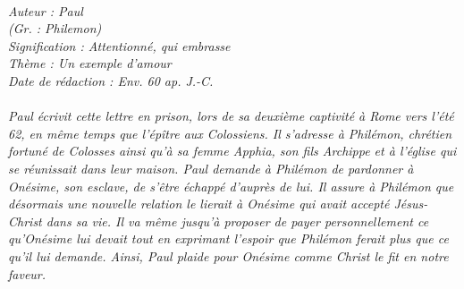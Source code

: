 \BFont
\noindent\hrulefill
{\footnotesize
\textit{
\bigskip
{\centering{}
\\Auteur : Paul
\\(Gr. : Philemon)
\\Signification : Attentionné, qui embrasse
\\Thème : Un exemple d'amour
\\Date de rédaction : Env. 60 ap. J.-C.\\}
}
\textit{
\\Paul écrivit cette lettre en prison, lors de sa deuxième captivité à Rome vers l’été 62, en même temps que l’épître aux Colossiens. Il s’adresse à Philémon, chrétien fortuné de Colosses ainsi qu’à sa femme Apphia, son fils Archippe et à l’église qui se réunissait dans leur maison. Paul demande à Philémon de pardonner à Onésime, son esclave, de s’être échappé d’auprès de lui. Il assure à Philémon que désormais une nouvelle relation le lierait à Onésime qui avait accepté Jésus-Christ dans sa vie. Il va même jusqu’à proposer de payer personnellement ce qu’Onésime lui devait tout en exprimant l’espoir que Philémon ferait plus que ce qu’il lui demande. Ainsi, Paul plaide pour Onésime comme Christ le fit en notre faveur.\bigskip
}
}
\par\nobreak\noindent\hrulefill
